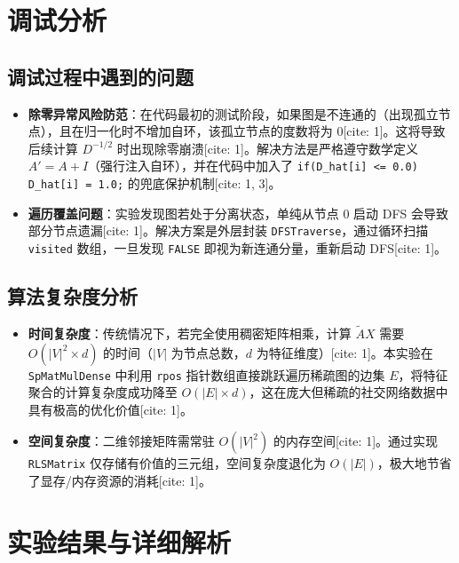 \documentclass[12pt,a4paper]{article}
\begin{document}
\section{调试分析}

\subsection{调试过程中遇到的问题}
\begin{itemize}
    \item \textbf{除零异常风险防范}：在代码最初的测试阶段，如果图是不连通的（出现孤立节点），且在归一化时不增加自环，该孤立节点的度数将为 0[cite: 1]。这将导致后续计算 $D^{-1/2}$ 时出现除零崩溃[cite: 1]。解决方法是严格遵守数学定义 $A' = A + I$（强行注入自环），并在代码中加入了 \texttt{if(D\_hat[i] <= 0.0) D\_hat[i] = 1.0;} 的兜底保护机制[cite: 1, 3]。
    \item \textbf{遍历覆盖问题}：实验发现图若处于分离状态，单纯从节点 0 启动 DFS 会导致部分节点遗漏[cite: 1]。解决方案是外层封装 \texttt{DFSTraverse}，通过循环扫描 \texttt{visited} 数组，一旦发现 \texttt{FALSE} 即视为新连通分量，重新启动 DFS[cite: 1]。
\end{itemize}

\subsection{算法复杂度分析}
\begin{itemize}
    \item \textbf{时间复杂度}：传统情况下，若完全使用稠密矩阵相乘，计算 $\tilde{A}X$ 需要 $O(|V|^2 \times d)$ 的时间（$|V|$ 为节点总数，$d$ 为特征维度）[cite: 1]。本实验在 \texttt{SpMatMulDense} 中利用 \texttt{rpos} 指针数组直接跳跃遍历稀疏图的边集 $E$，将特征聚合的计算复杂度成功降至 $O(|E| \times d)$，这在庞大但稀疏的社交网络数据中具有极高的优化价值[cite: 1]。
    \item \textbf{空间复杂度}：二维邻接矩阵需常驻 $O(|V|^2)$ 的内存空间[cite: 1]。通过实现 \texttt{RLSMatrix} 仅存储有价值的三元组，空间复杂度退化为 $O(|E|)$，极大地节省了显存/内存资源的消耗[cite: 1]。
\end{itemize}

\section{实验结果与详细解析}
\end{document}
